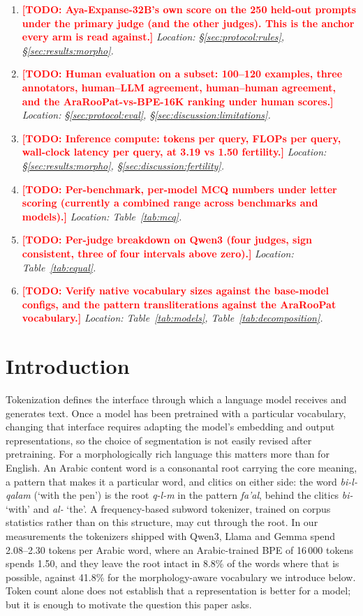 \documentclass[a4paper,fleqn]{cas-sc}
\newcommand{\todo}[1]{\textcolor{red}{\textbf{[\textsc{TODO}: #1]}}}
\begin{document}
\begin{enumerate}
\item \todo{Aya-Expanse-32B's own score on the 250 held-out prompts under the primary judge (and the other judges). This is the anchor every arm is read against.} \emph{Location: \S\ref{sec:protocol:rules}, \S\ref{sec:results:morpho}.}
\item \todo{Human evaluation on a subset: 100--120 examples, three annotators, human--LLM agreement, human--human agreement, and the AraRooPat-vs-BPE-16K ranking under human scores.} \emph{Location: \S\ref{sec:protocol:eval}, \S\ref{sec:discussion:limitations}.}
\item \todo{Inference compute: tokens per query, FLOPs per query, wall-clock latency per query, at 3.19 vs 1.50 fertility.} \emph{Location: \S\ref{sec:results:morpho}, \S\ref{sec:discussion:fertility}.}
\item \todo{Per-benchmark, per-model MCQ numbers under letter scoring (currently a combined range across benchmarks and models).} \emph{Location: Table~\ref{tab:mcq}.}
\item \todo{Per-judge breakdown on Qwen3 (four judges, sign consistent, three of four intervals above zero).} \emph{Location: Table~\ref{tab:equal}.}
\item \todo{Verify native vocabulary sizes against the base-model configs, and the pattern transliterations against the AraRooPat vocabulary.} \emph{Location: Table~\ref{tab:models}, Table~\ref{tab:decomposition}.}
\end{enumerate}

\newpage

\section{Introduction}
\label{sec:intro}

Tokenization defines the interface through which a language model receives and generates text. Once a model has been pretrained with a particular vocabulary, changing that interface requires adapting the model's embedding and output representations, so the choice of segmentation is not easily revised after pretraining. For a morphologically rich language this matters more than for English. An Arabic content word is a consonantal root carrying the core meaning, a pattern that makes it a particular word, and clitics on either side: the word \emph{bi-l-qalam} (`with the pen') is the root \emph{q-l-m} in the pattern \emph{fa'al}, behind the clitics \emph{bi-} `with' and \emph{al-} `the'. A frequency-based subword tokenizer, trained on corpus statistics rather than on this structure, may cut through the root. In our measurements the tokenizers shipped with Qwen3, Llama and Gemma spend 2.08--2.30 tokens per Arabic word, where an Arabic-trained BPE of 16\,000 tokens spends 1.50, and they leave the root intact in 8.8\% of the words where that is possible, against 41.8\% for the morphology-aware vocabulary we introduce below. Token count alone does not establish that a representation is better for a model; but it is enough to motivate the question this paper asks.
\end{document}
